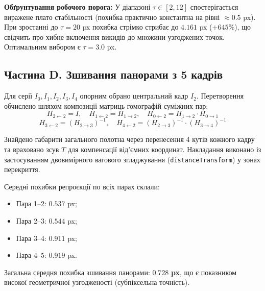 \documentclass[14pt, a4paper]{article}
\begin{document}
\textbf{Обґрунтування робочого порога:} У діапазоні $\tau \in [2, 12]$ спостерігається виражене плато стабільності (похибка практично константна на рівні $\approx 0.5$ px). При зростанні до $\tau = 20$ px похибка стрімко стрибає до $4.161$ px ($+645\%$), що свідчить про хибне включення викидів до множини узгоджених точок. Оптимальним вибором є $\tau = 3.0$ px.

\begin{figure}[h!]
\centering
{}
\end{figure}

\begin{figure}[h!]
\centering
{}
\end{figure}

\subsection{Частина D. Зшивання панорами з 5 кадрів}
Для серії $I_0, I_1, I_2, I_3, I_4$ опорним обрано центральний кадр $I_2$. Перетворення обчислено шляхом композиції матриць гомографій суміжних пар:
\begin{equation}
H_{2 \leftarrow 2} = I, \quad H_{1 \leftarrow 2} = H_{1 \to 2}, \quad H_{0 \leftarrow 2} = H_{1 \to 2} \cdot H_{0 \to 1}
\end{equation}
\begin{equation}
H_{3 \leftarrow 2} = (H_{2 \to 3})^{-1}, \quad H_{4 \leftarrow 2} = (H_{2 \to 3})^{-1} \cdot (H_{3 \to 4})^{-1}
\end{equation}

Знайдено габарити загального полотна через перенесення 4 кутів кожного кадру та враховано зсув $T$ для компенсації від'ємних координат. Накладання виконано із застосуванням двовимірного вагового згладжування (\texttt{distanceTransform}) у зонах перекриття.

Середні похибки репроєкції по всіх парах склали:
\begin{itemize}
    \item Пара 1--2: $0.537$ px;
    \item Пара 2--3: $0.544$ px;
    \item Пара 3--4: $0.911$ px;
    \item Пара 4--5: $0.919$ px.
\end{itemize}
Загальна середня похибка зшивання панорами: $\mathbf{0.728}$ \textbf{px}, що є показником високої геометричної узгодженості (субпіксельна точність).
\end{document}
